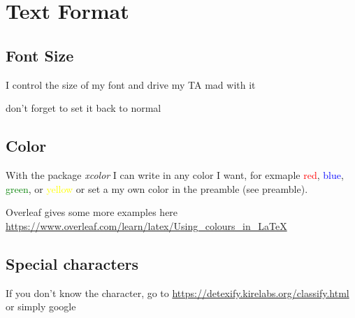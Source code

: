 \section{Text Format}

\subsection{Font Size}

\tiny I  
\scriptsize control  
\footnotesize the size 
\small of my
\normalsize font
\large and drive 
\Large my TA
\LARGE mad  
\huge with  
\Huge{it}

\normalsize don't forget to set it back to normal


\subsection{Color}\label{color}
With the package \textit{xcolor} I can write in any color I want, for exmaple 
\textcolor{red}{red},
\textcolor{blue}{blue},
\textcolor{green}{green}, or
\textcolor{yellow}{yellow} or set a 
\textcolor{mypink3}{my own color}
\textcolor{prettyorange}{in the preamble (see preamble)}.

Overleaf gives some more examples here \url{https://www.overleaf.com/learn/latex/Using_colours_in_LaTeX}

\subsection{Special characters}
If you don't know the character, go to
\url{https://detexify.kirelabs.org/classify.html} or simply google

